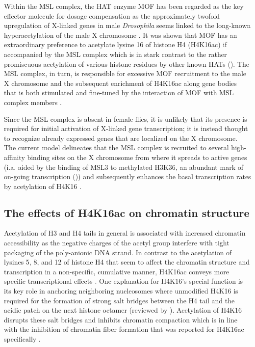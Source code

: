 Within the MSL complex, the HAT enzyme MOF has been regarded as the key effector molecule for dosage compensation as the approximately twofold upregulation of X-linked genes in male \textit{Drosophila} seems linked to the long-known hyperacetylation of the male X chromosome \cite{Turner1992,Bone1994}. It was shown that MOF has an extraordinary preference to acetylate lysine 16 of histone H4 (H4K16ac) if accompanied by the MSL complex \citep{Akhtar2000, Smith2000, Li2009, Cai2010} which is in stark contrast to the rather promiscuous acetylation of various histone residues by other known HATs \citep{Lee2007} (). The MSL complex, in turn, is responsible for excessive MOF recruitment to the male X chromosome and the subsequent enrichment of H4K16ac along gene bodies \citep{Turner1992, Gelbart2009} that is both stimulated and fine-tuned by the interaction of MOF with MSL complex members \citep{Morales2004, Prestel2010, Kadlec2011}.

Since the MSL complex is absent in female flies, it is unlikely that its presence is required for initial activation of X-linked gene transcription; it is instead thought to recognize already expressed genes that are localized on the X chromosome. The current model delineates that the MSL complex is recruited to several high-affinity binding sites on the X chromosome from where it spreads to active genes (i.a. aided by the binding of MSL3 to methylated H3K36, an abundant mark of on-going transcription \citep{Larschan2007} ()) and subsequently enhances the basal transcription rates by acetylation of H4K16 \citep{Conrad2011}. 
%
\subsection{The effects of H4K16ac on chromatin structure}
Acetylation of H3 and H4 tails in general is associated with increased chromatin accessibility as the negative charges of the acetyl group interfere with tight packaging of the poly-anionic DNA strand. In contrast to the acetylation of lysines 5, 8, and 12 of histone H4 that seem to affect the chromatin structure and transcription in a non-specific, cumulative manner, H4K16ac conveys more specific transcriptional effects \citep{Dion2005}. One explanation for H4K16’s special function is its key role in anchoring neighboring nucleosomes where unmodified H4K16 is required for the formation of strong salt bridges between the H4 tail and the acidic patch on the next histone octamer (reviewed by \citet{Kalashnikova2013, Preez2013}). Acetylation of H4K16 disrupts these salt bridges and inhibits chromatin compaction which is in line with the inhibition of chromatin fiber formation that was reported for H4K16ac specifically \citep{Shogren-Knaak2006, Robinson2008}.
%
